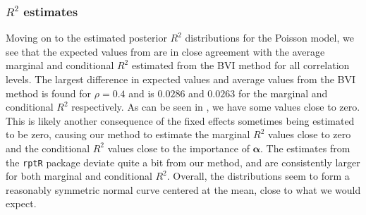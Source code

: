 \subsubsection{$R^2$ estimates}
Moving on to the estimated posterior $R^2$ distributions for the Poisson model, we see that the expected values from  are in close agreement with the average marginal and conditional $R^2$ estimated from the BVI method for all correlation levels. The largest difference in expected values and average values from the BVI method is found for $\rho=0.4$ and is $0.0286$ and $0.0263$ for the marginal and conditional $R^2$ respectively. As can be seen in , we have some values close to zero. This is likely another consequence of the fixed effects sometimes being estimated to be zero, causing our method to estimate the marginal $R^2$ values close to zero and the conditional $R^2$ values close to the importance of $\boldsymbol{\alpha}$. The estimates from the \texttt{rptR} package deviate quite a bit from our method, and are consistently larger for both marginal and conditional $R^2$. Overall, the distributions seem to form a reasonably symmetric normal curve centered at the mean, close to what we would expect.

